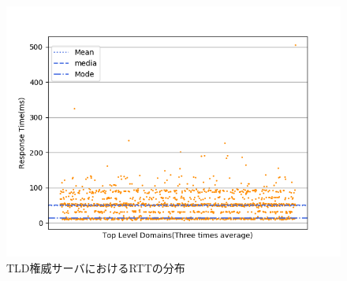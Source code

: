 \begin{figure}[h]
 \centering
 \includegraphics[scale=0.8]{figure/average_rtt.png}
 \caption{TLD権威サーバにおけるRTTの分布}
 \label{fig:tlr-rtt}
\end{figure}

